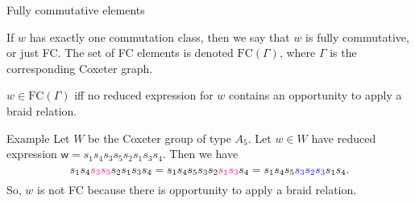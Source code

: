 \documentclass[9pt]{beamer}
\newcommand{\w}{{\textsf{w}}}
\newcommand{\FC}{\mathrm{FC}}
\begin{document}
\begin{frame}{Fully commutative elements}
\begin{definition} If $w$ has exactly one commutation class, then we say that $w$ is \alert{fully commutative}, or just \alert{FC}. The set of FC elements is denoted $\FC(\Gamma)$, where $\Gamma$ is the corresponding Coxeter graph.
\end{definition}

\pause

\begin{theorem}[Stembridge]
$w \in \FC(\Gamma)$ iff no reduced expression for $w$ contains an opportunity to apply a braid relation.
\end{theorem}

\pause

\begin{block}{Example} Let $W$ be the Coxeter group of type $A_5$. Let $w \in W$ have reduced expression $\w = s_1 s_4 s_3 s_5 s_2 s_1 s_3 s_4$. Then we have 
    $$s_1 s_4 \textcolor{magenta}{s_3 s_5} s_2 s_1 s_3 s_4 = s_1 s_4 s_5 s_3 s_2 \textcolor{magenta}{s_1 s_3} s_4 = s_1 s_4 s_5 \textcolor{blue}{s_3 s_2 s_3} s_1 s_4.$$
    So, $w$ is not FC because there is opportunity to apply a braid relation.
\end{block}
\end{frame}


%
\end{document}
